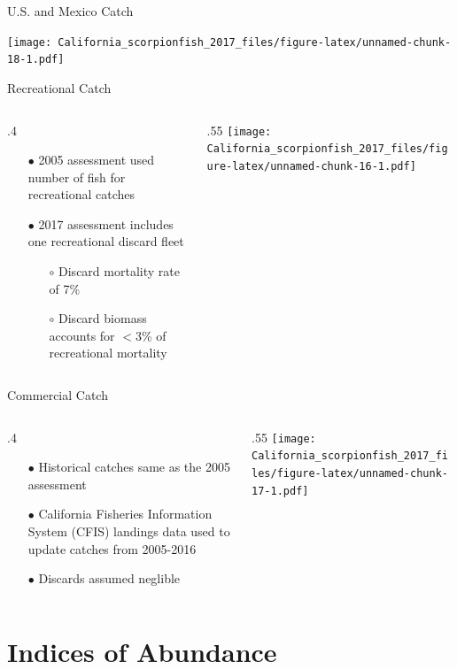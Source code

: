 \documentclass[ignorenonframetext,compress]{beamer}
\def\begincols{\begin{columns}}
\def\begincol{\begin{column}}
\def\endcol{\end{column}}
\def\endcols{\end{columns}}
\begin{document}
\begin{frame}{U.S. and Mexico Catch}

\texttt{[image: California\_scorpionfish\_2017\_files/figure-latex/unnamed-chunk-18-1.pdf]}

\end{frame}

\begin{frame}{Recreational Catch}

\begincols
 \begincol{.4\textwidth}

\begin{itemize}
\item[$\bullet$] 2005 assessment used number of fish for recreational catches
\item[$\bullet$] 2017 assessment includes one recreational discard fleet
\begin{itemize}
\item[$\circ$] Discard mortality rate of 7\%
\item[$\circ$] Discard biomass accounts for  $<$3\% of recreational mortality
\end{itemize}
\end{itemize}

\endcol
 \begincol{.55\textwidth}
\texttt{[image: California\_scorpionfish\_2017\_files/figure-latex/unnamed-chunk-16-1.pdf]}\\
\endcol
\endcols

\end{frame}

\begin{frame}{Commercial Catch}

\begincols
 \begincol{.4\textwidth}

\begin{itemize}
  \item[$\bullet$] Historical catches same as the 2005 assessment
  \item[$\bullet$] California Fisheries Information System (CFIS) landings data used to update catches from 2005-2016 
  \item[$\bullet$] Discards assumed neglible
\end{itemize}

\endcol
 \begincol{.55\textwidth}
\texttt{[image: California\_scorpionfish\_2017\_files/figure-latex/unnamed-chunk-17-1.pdf]}
\endcol
\endcols

\end{frame}

\section{Indices of Abundance}\label{indices-of-abundance}
\end{document}
